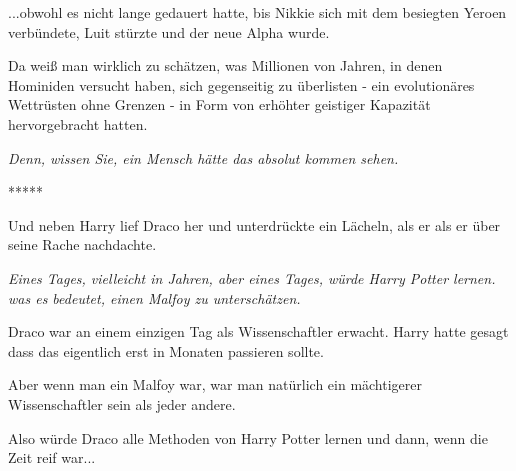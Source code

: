 ...obwohl es nicht lange gedauert hatte, bis Nikkie sich mit dem besiegten
Yeroen verbündete, Luit stürzte und der neue Alpha wurde.

Da weiß man wirklich zu schätzen, was Millionen von Jahren, in denen Hominiden
versucht haben, sich gegenseitig zu überlisten - ein evolutionäres Wettrüsten
ohne Grenzen - in Form von erhöhter geistiger Kapazität hervorgebracht hatten.

\emph{Denn, wissen Sie, ein Mensch hätte das absolut kommen sehen.}

\begin{center}*****\end{center}

Und neben Harry lief Draco her und unterdrückte ein Lächeln, als er als er über
seine Rache nachdachte.

\emph{Eines Tages, vielleicht in Jahren, aber eines Tages, würde Harry Potter
lernen. was es bedeutet, einen Malfoy zu unterschätzen.}

Draco war an einem einzigen Tag als Wissenschaftler erwacht. Harry hatte gesagt
dass das eigentlich erst in Monaten passieren sollte.

Aber wenn man ein Malfoy war, war man natürlich ein mächtigerer Wissenschaftler
sein als jeder andere.

Also würde Draco alle Methoden von Harry Potter lernen und dann, wenn die Zeit
reif war...
